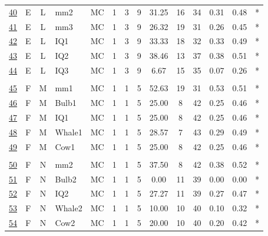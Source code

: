 \documentclass[12pt,english,nohyper]{tufte-handout}\usepackage[]{graphicx}\usepackage[]{color}
\begin{document}
\begin{longtable}{cccl|cccc|ccccc|l}
  \hyperlink{T06.E.L.09.3.1.MC.mm2.2}{40} & E & L & mm2 & MC &   1 &   3 &   9 & 31.25 &  16 &  34 & 0.31 & 0.48 & * \\ 
  \hyperlink{T06.E.L.09.3.1.MC.mm3.2}{41} & E & L & mm3 & MC &   1 &   3 &   9 & 26.32 &  19 &  31 & 0.26 & 0.45 & * \\ 
  \hyperlink{T06.E.L.09.3.1.MC.IQ1.2}{42} & E & L & IQ1 & MC &   1 &   3 &   9 & 33.33 &  18 &  32 & 0.33 & 0.49 & * \\ 
  \hyperlink{T06.E.L.09.3.1.MC.IQ2.2}{43} & E & L & IQ2 & MC &   1 &   3 &   9 & 38.46 &  13 &  37 & 0.38 & 0.51 & * \\ 
  \hyperlink{T06.E.L.09.3.1.MC.IQ3.2}{44} & E & L & IQ3 & MC &   1 &   3 &   9 & 6.67 &  15 &  35 & 0.07 & 0.26 & * \\ 
   &  &  &  &  &  &  &  &  &  &  &  &  &  \\ 
  \hyperlink{T06.F.M.05.1.1.MC.mm1.2}{45} & F & M & mm1 & MC &   1 &   1 &   5 & 52.63 &  19 &  31 & 0.53 & 0.51 & * \\ 
  \hyperlink{T06.F.M.05.1.1.MC.Bulb1.2}{46} & F & M & Bulb1 & MC &   1 &   1 &   5 & 25.00 &   8 &  42 & 0.25 & 0.46 & * \\ 
  \hyperlink{T06.F.M.05.1.1.MC.IQ1.2}{47} & F & M & IQ1 & MC &   1 &   1 &   5 & 25.00 &   8 &  42 & 0.25 & 0.46 & * \\ 
  \hyperlink{T06.F.M.05.1.1.MC.Whale1.2}{48} & F & M & Whale1 & MC &   1 &   1 &   5 & 28.57 &   7 &  43 & 0.29 & 0.49 & * \\ 
  \hyperlink{T06.F.M.05.1.1.MC.Cow1.2}{49} & F & M & Cow1 & MC &   1 &   1 &   5 & 25.00 &   8 &  42 & 0.25 & 0.46 & * \\ 
   &  &  &  &  &  &  &  &  &  &  &  &  &  \\ 
  \hyperlink{T06.F.N.05.1.1.MC.mm2.2}{50} & F & N & mm2 & MC &   1 &   1 &   5 & 37.50 &   8 &  42 & 0.38 & 0.52 & * \\ 
  \hyperlink{T06.F.N.05.1.1.MC.Bulb2.2}{51} & F & N & Bulb2 & MC &   1 &   1 &   5 & 0.00 &  11 &  39 & 0.00 & 0.00 & * \\ 
  \hyperlink{T06.F.N.05.1.1.MC.IQ2.2}{52} & F & N & IQ2 & MC &   1 &   1 &   5 & 27.27 &  11 &  39 & 0.27 & 0.47 & * \\ 
  \hyperlink{T06.F.N.05.1.1.MC.Whale2.2}{53} & F & N & Whale2 & MC &   1 &   1 &   5 & 10.00 &  10 &  40 & 0.10 & 0.32 & * \\ 
  \hyperlink{T06.F.N.05.1.1.MC.Cow2.2}{54} & F & N & Cow2 & MC &   1 &   1 &   5 & 20.00 &  10 &  40 & 0.20 & 0.42 & * \\ 

\end{longtable}
\end{document}
